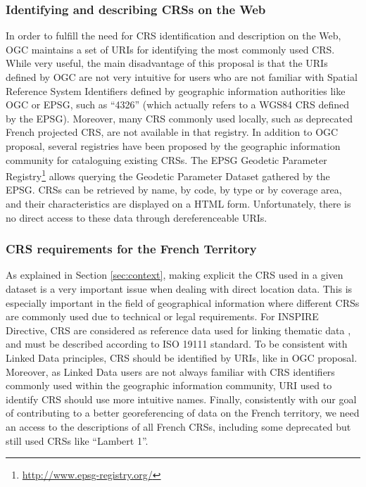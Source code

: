 \subsubsection{Identifying and describing CRSs on the Web}
In order to fulfill the need for CRS identification and description on the Web, OGC maintains a set of URIs for identifying the most commonly used CRS. While very useful, the main disadvantage of this proposal is that the URIs defined by OGC are not very intuitive for users who are not familiar with Spatial Reference System Identifiers defined by geographic information authorities like OGC or EPSG, such as ``4326'' (which actually refers to a WGS84 CRS defined by the EPSG). Moreover, many CRS commonly used locally, such as deprecated French projected CRS, are not available in that registry. In addition to OGC proposal, several registries have been proposed by the geographic information community for cataloguing existing CRSs.
The EPSG Geodetic Parameter Registry\footnote{\url{http://www.epsg-registry.org/}} allows querying the Geodetic Parameter Dataset gathered by the EPSG. CRSs can be retrieved by name, by code, by type or by coverage area, and their characteristics are displayed on a HTML form. Unfortunately, there is no direct access to these data through dereferenceable URIs.

\subsubsection{CRS requirements for the  French Territory} \label{sec:reqs}

As explained in Section \ref{sec:context}, making explicit the CRS used in a given dataset is a very important issue when dealing with direct location data. This is especially important in the field of geographical information where different CRSs are commonly used due to technical or legal requirements. For INSPIRE Directive, CRS are considered as reference data used for linking thematic data \cite{inspire2009}, and must be described according to ISO 19111 standard. To be consistent with Linked Data principles, CRS should be identified by URIs, like in OGC proposal. Moreover, as Linked Data users are not always familiar with CRS identifiers commonly used within the geographic information community, URI used to identify CRS should use more intuitive names. Finally, consistently with our goal of contributing to a better georeferencing of data on the French territory, we need an access to the descriptions of all French CRSs, including some deprecated but still used CRSs like ``Lambert 1''.

